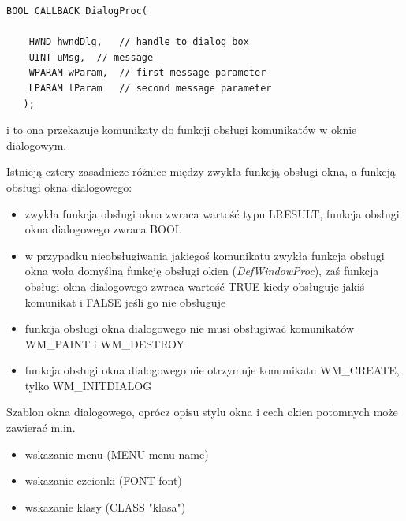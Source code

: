 \begin{scriptsize}
\begin{verbatim}
BOOL CALLBACK DialogProc(

    HWND hwndDlg,	// handle to dialog box
    UINT uMsg,	// message
    WPARAM wParam,	// first message parameter
    LPARAM lParam 	// second message parameter
   );	
\end{verbatim}
\end{scriptsize}

i to ona przekazuje komunikaty do funkcji obsługi komunikatów w oknie dialogowym.

Istnieją cztery zasadnicze różnice między zwykła funkcją obsługi okna, a funkcją obsługi okna dialogowego:
\begin{itemize}
\item zwykła funkcja obsługi okna zwraca wartość typu LRESULT, funkcja obsługi okna dialogowego zwraca BOOL
\item w przypadku nieobsługiwania jakiegoś komunikatu zwykła funkcja obsługi okna woła domyślną funkcję 
obsługi okien ({\em DefWindowProc}), zaś funkcja obsługi okna dialogowego zwraca wartość TRUE kiedy
obsługuje jakiś komunikat i FALSE jeśli go nie obsługuje
\item funkcja obsługi okna dialogowego nie musi obsługiwać komunikatów WM\_PAINT i WM\_DESTROY
\item funkcja obsługi okna dialogowego nie otrzymuje komunikatu WM\_CREATE, tylko WM\_INITDIALOG
\end{itemize}

Szablon okna dialogowego, oprócz opisu stylu okna i cech okien potomnych może zawierać m.in.
\begin{itemize}
\item wskazanie menu (MENU menu-name)
\item wskazanie czcionki (FONT font)
\item wskazanie klasy (CLASS "klasa")
\end{itemize}

